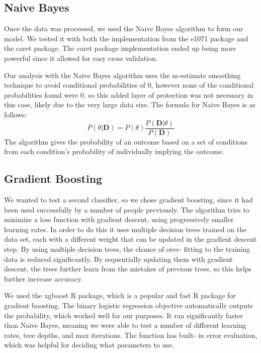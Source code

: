 \documentclass[fleqn,10pt]{SelfArx} %
\begin{document}
\subsection{Naive Bayes}
Once the data was processed, we used the Naive Bayes algorithm to form our model. We tested it with both the implementation from the e1071 package and the caret package. The caret package implementation ended up being more powerful since it allowed for easy cross validation. 

Our analysis with the Naive Bayes algorithm uses the m-estimate smoothing technique to avoid conditional probabilities of 0, however none of the conditional probabilities found were 0, so this added layer of protection was not necessary in this case, likely due to the very large data size. The formula for Naive Bayes is as follows:
\begin{equation}
\label{eq:bayes}
P(\theta|\textbf{D}) = P(\theta ) \frac{P(\textbf{D} |\theta)}{P(\textbf{D})}
\end{equation}
The algorithm gives the probability of an outcome based on a set of conditions from each condition’s probability of individually implying the outcome.

\subsection{Gradient Boosting}
We wanted to test a second classifier, so we chose gradient boosting, since it had been used successfully by a number of people previously. The algorithm tries to minimize a loss function with gradient descent, using progressively smaller learning rates. In order to do this it uses multiple decision trees trained on the data set, each with a different weight that can be updated in the gradient descent step. By using multiple decision trees, the chance of over- fitting to the training data is reduced significantly. By sequentially updating them with gradient descent, the trees further learn from the mistakes of previous trees, so this helps further increase accuracy. 

We used the xgboost R package, which is a popular and fast R package for gradient boosting. The binary logistic regression objective automatically outputs the probability, which worked well for our purposes. It ran significantly faster than Naive Bayes, meaning we were able to test a number of different learning rates, tree depths, and max iterations. The function has built- in error evaluation, which was helpful for deciding what parameters to use. 
\end{document}
